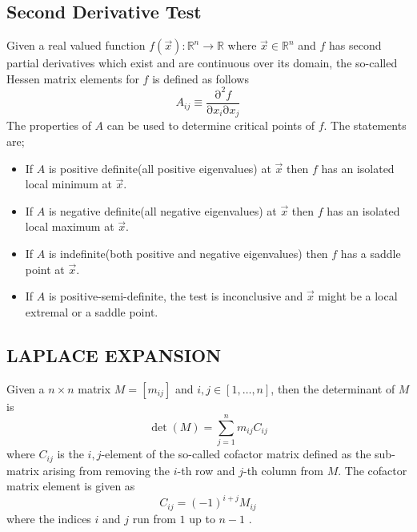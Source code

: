 \documentclass[a4paper, hidelinks, 10pt]{article}
\let\oldsubsection\subsection
\renewcommand{\subsection}[1]{\centering \oldsubsection{{#1}} \justifying}
\newcommand{\prtl}{\mathrm{\partial}} %
\newcommand{\rarr}{\rightarrow} %
\newcommand{\suml}[2]{\sum\limits_{#1=1}^{#2}}
\begin{document}
\subsection{Second Derivative Test}
\label{sub:second_derivative_test}
    Given a real valued function $f(\vec{x}):\mathbb{R}^n\rarr\mathbb{R}$ where
    $\vec{x}\in\mathbb{R}^n$ and $f$ has second partial derivatives which exist
    and are continuous over its domain, the so-called Hessen matrix elements
    for $f$ is defined as follows \cite{linalgDavid}
        \begin{equation}
            A_{ij} \equiv \frac{\prtl^2f}{\prtl x_i\prtl x_j}
            \label{eq:hessendef}
        \end{equation}
    The properties of $A$ can be used to determine critical points of $f$. The
    statements are;
        \begin{itemize}
            \item If $A$ is positive definite(all positive eigenvalues) at
                $\vec{x}$ then $f$ has an isolated  local minimum at $\vec{x}$.
            \item If $A$ is negative definite(all negative eigenvalues) at
                $\vec{x}$ then $f$ has an isolated  local maximum at $\vec{x}$.
            \item If $A$ is indefinite(both positive and negative eigenvalues)
                then $f$ has a saddle point at $\vec{x}$.
            \item If $A$ is positive-semi-definite, the test is inconclusive
                and $\vec{x}$ might be a local extremal or a saddle point.
        \end{itemize}

\subsection{LAPLACE EXPANSION}
\label{sub:laplace_expansion}
    Given a $n\times n$ matrix $M=[m_{ij}]$ and $i,j\in[1,\dots,n]$, then the
    determinant of $M$ is
        \begin{equation}
            \det(M) = \suml{j}{n}m_{ij}C_{ij}
            \label{eq:laplaceexp}
        \end{equation}
    where $C_{ij}$ is the $i,j$-element of the so-called cofactor matrix
    defined as the sub-matrix arising from removing the $i$-th row and $j$-th
    column from $M$. The cofactor matrix element is given as
        \begin{equation}
            C_{ij} = (-1)^{i+j}M_{ij}
            \label{eq:cofactor}
        \end{equation}
    where the indices $i$ and $j$ run from $1$ up to $n-1$ \cite{linalgDavid}.
\end{document}
